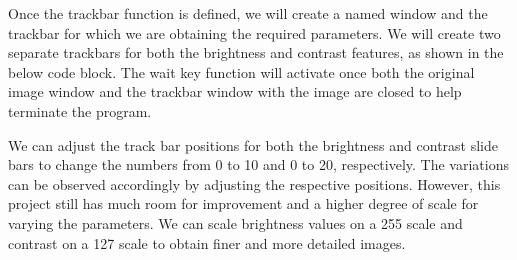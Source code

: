 
\PYTHON{\qquad }



\PYTHON{\qquad }


\PYTHON{\qquad }


\medskip


Once the trackbar function is defined, we will create a named window and the trackbar for which we are obtaining the required parameters. We will create two separate trackbars for both the brightness and contrast features, as shown in the below code block. The wait key function will activate once both the original image window and the trackbar window with the image are closed to help terminate the program.

\medskip



\PYTHON{}


\PYTHON{}




\PYTHON{}




\PYTHON{}



\medskip


We can adjust the track bar positions for both the brightness and contrast slide bars to change the numbers from 0 to 10 and 0 to 20, respectively. The variations can be observed accordingly by adjusting the respective positions. However, this project still has much room for improvement and a higher degree of scale for varying the parameters. We can scale brightness values on a 255 scale and contrast on a 127 scale to obtain finer and more detailed images.

